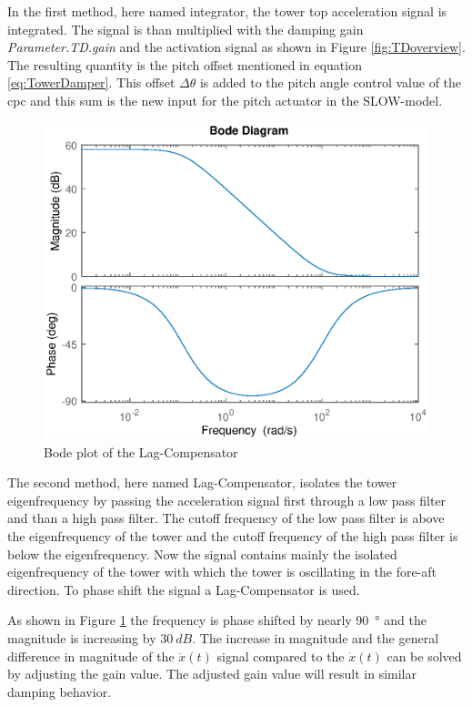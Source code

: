 In the first method, here named integrator, the tower top acceleration signal is integrated.
The signal is than multiplied with the damping gain \textit{Parameter.TD.gain} and the activation signal as shown in Figure \ref{fig:TDoverview}.
The resulting quantity is the pitch offset mentioned in equation \ref{eq:TowerDamper}.
This offset $\Delta\theta$ is added to the pitch angle control value of the \gls{cpc} and this sum is the new input for the pitch actuator in the SLOW-model.

\begin{figure}[h]
	\centering	
	\includegraphics[width=12cm]{Figures/BodeLagCompensator.eps}
	\caption{Bode plot of the Lag-Compensator}
	\label{fig:BodeLag}
\end{figure}

The second method, here named Lag-Compensator, isolates the tower eigenfrequency by passing the acceleration signal first through a low pass filter and than a high pass filter. The cutoff frequency of the low pass filter is above the eigenfrequency of the tower and the cutoff frequency of the high pass filter is below the eigenfrequency. Now the signal contains mainly the isolated eigenfrequency of the tower with which the tower is oscillating in the fore-aft direction. To phase shift the signal a Lag-Compensator is used.


As shown in Figure \ref{fig:BodeLag} the frequency is phase shifted by nearly \SI{90}{\degree} and the magnitude is increasing by $\SI{30}{dB}$. The increase in magnitude and the general difference in magnitude of the $\ddot{x}(t)$ signal compared to the $\dot{x}(t)$ can be solved by adjusting the gain value. The adjusted gain value will result in similar damping behavior.

